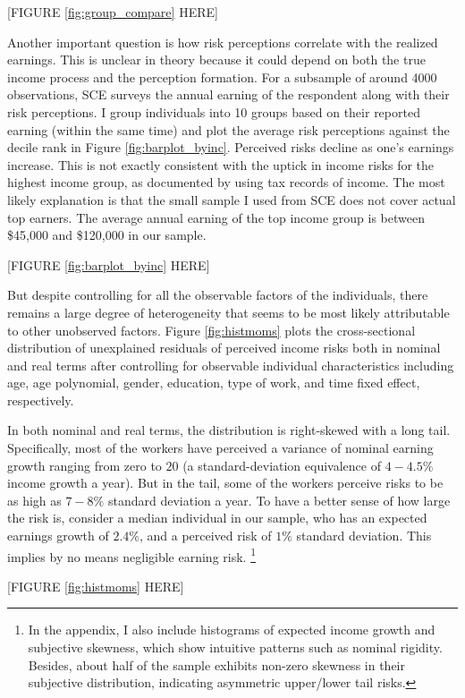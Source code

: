
\begin{center}
 [FIGURE \ref{fig:group_compare} HERE]
 \end{center}
 
Another important question is how risk perceptions correlate with the
realized earnings. This is unclear in theory because it could depend on both the true income process and the perception formation. For a subsample of around 4000 observations, SCE surveys the annual earning of the respondent along with their risk perceptions. I group individuals into 10 groups based on their reported earning (within the same time) and plot the average risk perceptions against the decile rank in Figure \ref{fig:barplot_byinc}. Perceived risks decline as one's earnings increase.  This is not exactly consistent with the uptick in income risks for the highest income group, as documented by \cite{bloom2018great} using tax records of income. The most likely explanation is that the small sample I used from SCE does not cover actual top earners. The average annual earning of the top income group is between \$45,000 and \$120,000 in our sample.  

\begin{center}
 [FIGURE \ref{fig:barplot_byinc} HERE]
\end{center}

But despite controlling for all the observable factors of the individuals, there remains a large degree of heterogeneity that seems to be most likely attributable to other unobserved factors. Figure \ref{fig:histmoms} plots the
cross-sectional distribution of unexplained residuals of perceived income risks both in nominal and real terms after controlling for observable individual characteristics including age, age polynomial, gender, education, type of work, and time fixed effect, respectively.

In both nominal
and real terms, the distribution is right-skewed with a long tail.
Specifically, most of the workers have perceived a variance of nominal
earning growth ranging from zero to \(20\) (a standard-deviation
equivalence of \(4-4.5\%\) income growth a year). But in the tail, some
of the workers perceive risks to be as high as \(7-8\%\) standard
deviation a year. To have a better sense of how large the risk is,
consider a median individual in our sample, who has an expected earnings
growth of \(2.4\%\), and a perceived risk of \(1\%\) standard deviation.
This implies by no means negligible earning risk.
\footnote{In the appendix, I also include histograms of expected income growth and subjective skewness, which show intuitive patterns such as nominal rigidity. Besides, about half of the sample exhibits non-zero skewness in their subjective distribution, indicating asymmetric upper/lower tail risks.}

\begin{center}
[FIGURE \ref{fig:histmoms} HERE]
\end{center}


